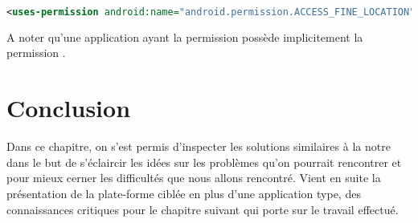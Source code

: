 \begin{lstlisting}[language=xml, caption=permission pour la localisation par GPS.]
<uses-permission android:name="android.permission.ACCESS_FINE_LOCATION"/>
\end{lstlisting}

A noter qu'une application ayant la permission  possède implicitement la permission .

\section{Conclusion}

Dans ce chapitre, on s'est permis d'inspecter les solutions similaires à
la notre dans le but de s'éclaircir les idées sur les problèmes qu'on
pourrait rencontrer et pour mieux cerner les difficultés que nous allons
rencontré. Vient en suite la présentation de la plate-forme ciblée en
plus d'une application type, des connaissances critiques pour le chapitre
suivant qui porte sur le travail effectué.
